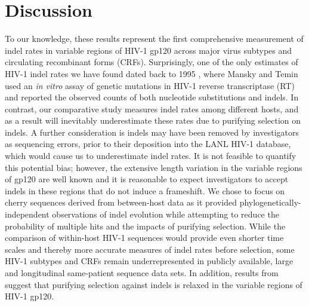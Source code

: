\documentclass[12pt]{article}
\newcommand{\todo}[2]{\hl{\textbf{#1:} #2}}
\begin{document}
\section * {Discussion}

To our knowledge, these results represent the first comprehensive measurement of indel rates in variable regions of HIV-1 gp120 across major virus subtypes and circulating recombinant forms (CRFs).
Surprisingly, one of the only estimates of HIV-1 indel rates we have found dated back to 1995 \citep{Mansky:1995}, where Mansky and Temin used an \textit{in vitro} assay of genetic mutations in HIV-1 reverse transcriptase (RT) and reported the observed counts of both nucleotide substitutions and indels.
In contrast, our comparative study measures indel rates among different hosts, and as a result will inevitably underestimate these rates due to purifying selection on indels.
A further consideration is indels may have been removed by investigators as sequencing errors, prior to their deposition into the LANL HIV-1 database, which would cause us to underestimate indel rates. 
It is not feasible to quantify this potential bias; however, the extensive length variation in the variable regions of gp120 are well known and it is reasonable to expect investigators to accept indels in these regions that do not induce a frameshift.
We chose to focus on cherry sequences derived from between-host data as it provided phylogenetically-independent observations of indel evolution while attempting to reduce the probability of multiple hits and the impacts of purifying selection.  
While the comparison of within-host HIV-1 sequences would provide even shorter time scales and thereby more accurate measures of indel rates before selection, some HIV-1 subtypes and CRFs remain underrepresented in publicly available, large and longitudinal same-patient sequence data sets.
In addition, results from \citet{wood2009hiv} suggest that purifying selection against indels is relaxed in the variable regions of HIV-1 gp120.
\end{document}
